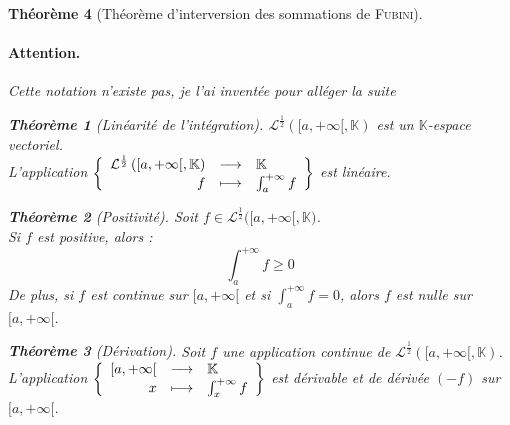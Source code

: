 \documentclass[11pt,a4paper]{report}
\newtheorem{theorem}{Théorème}[chapter]
\theoremstyle{definition}
\begin{document}
\begin{theorem}[Théorème d'interversion des sommations de \textsc{Fubini}]
\paragraph{Attention.} Cette notation n'existe pas, je l'ai inventée pour alléger la suite
\begin{theorem}[Linéarité de l'intégration]
    \label{thm:integration_linearite}
     $\mathcal{L}^\frac{1}{2}\left( [a,+\infty [,\mathbb{K} \right)$ est un $\mathbb{K}$-espace vectoriel.\\
     L'application $\left\lbrace \begin{array}{r c l}\mathcal{L}^\frac{1}{2}\left( [a,+\infty [,\mathbb{K} \right) &\longrightarrow &\mathbb{K}\\f&\longmapsto &\int_a^{+\infty} f\end{array} \right\rbrace$ est \emph{linéaire}.
\end{theorem}
\begin{theorem}[Positivité]
    \label{thm:integration_positivite}
     Soit $f \in \mathcal{L}^\frac{1}{2}\bigg( [a,+\infty [,\mathbb{K}\bigg)$.\\
     Si $f$ est positive, alors : 
     \begin{equation}
     \int_a^{+\infty} f \ge 0
     \end{equation}
     De plus, si $f$ est \emph{continue} sur $[a,+\infty[$ et si $\int_a^{+\infty} f = 0$, alors $f$ est nulle sur $[a,+\infty[$.
\end{theorem}
\begin{theorem}[Dérivation]
     Soit $f$ une application \emph{continue} de $\mathcal{L}^\frac{1}{2}\left( [a,+\infty [,\mathbb{K}\right)$.\\
     L'application $\left\lbrace \begin{array}{r c l} [a,+\infty [ &\longrightarrow &\mathbb{K}\\x&\longmapsto &\int_x^{+\infty} f\end{array} \right\rbrace$ est \emph{dérivable} et de dérivée $(-f)$ sur $[a,+\infty [$.
\end{theorem}



\end{theorem}
\end{document}

